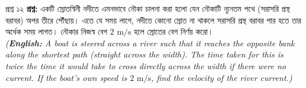 \documentclass[11pt,a4paper]{article}
\begin{document}
\vspace{0.4cm}

\begin{qbox}{প্রশ্ন ১২}
\textbf{প্রশ্ন:} একটি স্রোতস্বিনী নদীতে এমনভাবে নৌকা চালনা করা হলো যেন নৌকাটি ন্যূনতম পথে (সরাসরি প্রস্থ বরাবর) অপর তীরে পৌঁছায়। এতে যে সময় লাগে, নদীতে কোনো স্রোত না থাকলে সরাসরি প্রস্থ বরাবর পার হতে তার অর্ধেক সময় লাগত। নৌকার নিজস্ব বেগ $2\text{ m/s}$ হলে স্রোতের বেগ নির্ণয় করো। \\
\textit{(\textbf{English:} A boat is steered across a river such that it reaches the opposite bank along the shortest path (straight across the width). The time taken for this is twice the time it would take to cross directly across the width if there were no current. If the boat's own speed is $2\text{ m/s}$, find the velocity of the river current.)}
\end{qbox}
\end{document}
